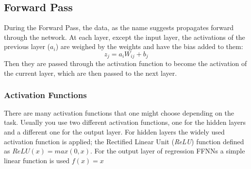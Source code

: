 \subsection{Forward Pass}
During the Forward Pass, the data, as the name suggests propagates forward through the network. At each layer, except the input layer, the activations of the previous layer ($a_i$) are weighed by the weights and have the bias added to them:
$$
z_j = a_i W_{ij} + b_j
$$
Then they are passed through the activation function to become the activation of the current layer, which are then passed to the next layer.
\subsubsection{Activation Functions}
There are many activation functions that one might choose depending on the task. Usually you use two different activation functions, one for the hidden layers and a different one for the output layer. For hidden layers the widely used activation function is applied; the Rectified Linear Unit (\textit{ReLU}) function defined as $ReLU(x)=max(0,x)$. For the output layer of regression FFNNs a simple linear function is used $f(x) = x$
